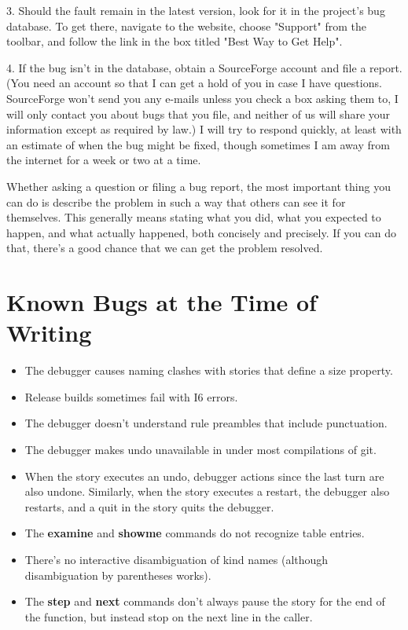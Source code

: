 \documentclass{book}
\newcommand{\glkinput}[1]{\textbf{#1}}
\begin{document}
3. Should the fault remain in the latest version, look for it in the project's
bug database.  To get there, navigate to the website, choose "Support" from the
toolbar, and follow the link in the box titled "Best Way to Get Help".

4. If the bug isn't in the database, obtain a SourceForge account and file a
report.  (You need an account so that I can get a hold of you in case I have
questions.  SourceForge won't send you any e-mails unless you check a box asking
them to, I will only contact you about bugs that you file, and neither of us
will share your information except as required by law.)  I will try to respond
quickly, at least with an estimate of when the bug might be fixed, though
sometimes I am away from the internet for a week or two at a time.

Whether asking a question or filing a bug report, the most important thing you
can do is describe the problem in such a way that others can see it for
themselves.  This generally means stating what you did, what you expected to
happen, and what actually happened, both concisely and precisely.  If you can do
that, there's a good chance that we can get the problem resolved.

\section*{Known Bugs at the Time of Writing}
\label{known}

\begin{itemize}
  \item{The debugger causes naming clashes with stories that define a size
    property.}
  \item{Release builds sometimes fail with I6 errors.}
  \item{The debugger doesn't understand rule preambles that include punctuation.}
  \item{The debugger makes undo unavailable in under most compilations of git.}
  \item{When the story executes an undo, debugger actions since the last turn
    are also undone.  Similarly, when the story executes a restart, the debugger
    also restarts, and a quit in the story quits the debugger.}
  \item{The \glkinput{examine} and \glkinput{showme} commands do not recognize
    table entries.}
  \item{There's no interactive disambiguation of kind names (although
    disambiguation by parentheses works).}
  \item{The \glkinput{step} and \glkinput{next} commands don't always pause the
    story for the end of the function, but instead stop on the next line in the
    caller.}
\end{itemize}
\end{document}
